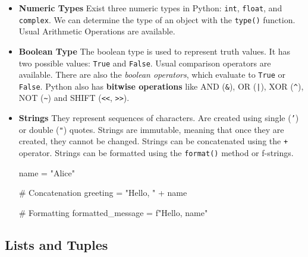 \begin{itemize}
    \item \textbf{Numeric Types}
    Exist three numeric types in Python: \texttt{int}, \texttt{float}, and \texttt{complex}. We can determine the type of an object 
    with the \texttt{type()} function. Usual Arithmetic Operations are available.
    \item \textbf{Boolean Type}
    The boolean type is used to represent truth values. It has two possible values: \texttt{True} and \texttt{False}. Usual comparison operators are available. There are also the \textit{boolean operators}, which evaluate to \texttt{True} or \texttt{False}.
    Python also has \textbf{bitwise operations} like AND (\texttt{\&}), OR (\texttt{|}), XOR (\texttt{\^}), NOT (\texttt{\~}) and SHIFT (\texttt{<<}, \texttt{>>}).
    \item \textbf{Strings}
    They represent sequences of characters. Are created using single (\texttt{'}) or double (\texttt{"}) quotes. Strings are immutable, meaning that once they are created, they cannot be changed. Strings can be concatenated using the \texttt{+} operator. Strings can be formatted using the \texttt{format()} method or f-strings.
    \begin{exampleblock}
    \begin{codeblock}[language=python]
name = "Alice"

# Concatenation
greeting = "Hello, " + name

# Formatting
formatted_message = f"Hello, {name}"
    \end{codeblock}
    \end{exampleblock}
\end{itemize}

\subsection{Lists and Tuples}

